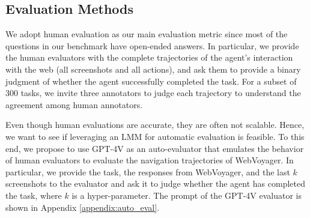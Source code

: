 \documentclass[11pt]{article}
\begin{document}
\subsection{Evaluation Methods}
We adopt human evaluation as our main evaluation metric since most of the questions in our benchmark have open-ended answers. In particular, we provide the human evaluators with the complete trajectories of the agent's interaction with the web (all screenshots and all actions), and ask them to provide a binary judgment of whether the agent successfully completed the task. %
For a subset of 300 tasks, we invite three annotators to judge each trajectory to understand the agreement among human annotators. %

Even though human evaluations are accurate, they are often not scalable.
Hence, we want to see if leveraging an LMM for automatic evaluation is feasible. To this end, we propose to use GPT-4V as an auto-evaluator that emulates the behavior of human evaluators to evaluate the navigation trajectories of WebVoyager. In particular, we provide the task, the responses from WebVoyager, and the last $k$ screenshots to the evaluator and ask it to judge whether the agent has completed the task, where $k$ is a hyper-parameter. The prompt of the GPT-4V evaluator is shown in Appendix \ref{appendix:auto_eval}.
\end{document}
